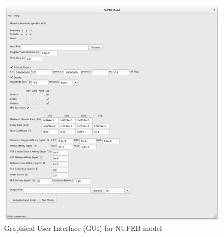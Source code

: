 \documentclass[11pt,a4paper,openright]{article}
\begin{document}
\begin{figure}[H]
\begin{center}
  \includegraphics[width=0.9\columnwidth]{Figs/GUI.pdf}
\caption{Graphical User Interface (GUI) for NUFEB model}
\label{fig:GUI}       %
\end{center}
\end{figure}
\end{document}
